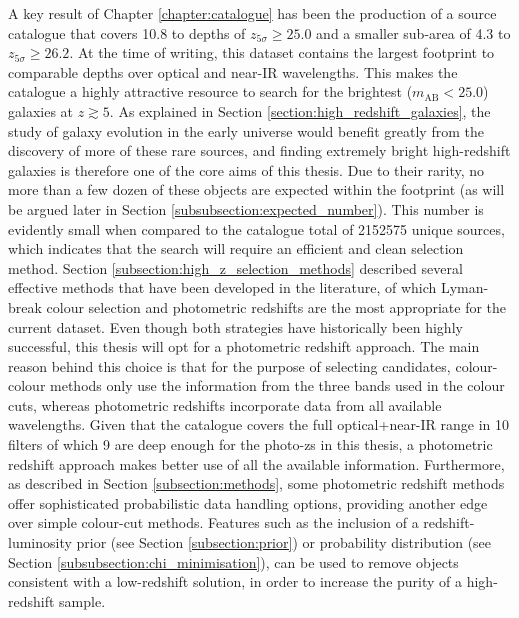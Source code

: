 A key result of Chapter \ref{chapter:catalogue} has been the production of a \DESVIDEO source catalogue  that covers \SI{10.8}{\sqdeg} to depths of $z_{5\sigma}\geq25.0$ and a smaller sub-area of \SI{4.3}{\sqdeg} to $z_{5\sigma}\geq26.2$. At the time of writing, this dataset contains the largest footprint to comparable depths over optical and near-IR wavelengths. This makes the \DESVIDEO catalogue a highly attractive resource to search for the brightest ($m_{\mathrm{AB}}<25.0$) galaxies at $z\gtrsim5$. As explained in Section \ref{section:high_redshift_galaxies}, the study of galaxy evolution in the early universe would benefit greatly from the discovery of more of these rare sources, and finding extremely bright high-redshift galaxies is therefore one of the core aims of this thesis. Due to their rarity, no more than a few dozen of these objects are expected within the \DESVIDEO footprint (as will be argued later in Section \ref{subsubsection:expected_number}). This number is evidently small when compared to the catalogue total of \num{2 152 575} unique sources, which indicates that the search will require an efficient and clean selection method. Section \ref{subsection:high_z_selection_methods} described several effective methods that have been developed in the literature, of which Lyman-break colour selection and photometric redshifts are the most appropriate for the current dataset. Even though both strategies have historically been highly successful, this thesis  will opt for a photometric redshift approach. The main reason behind this choice is that for the purpose of selecting candidates, colour-colour methods only use the information from the three bands used in the colour cuts, whereas photometric redshifts incorporate data from all available wavelengths. Given that the \DESVIDEO catalogue covers the full optical+near-IR range in 10 filters of which 9 are deep enough for the photo-zs in this thesis, a photometric redshift approach makes better use of all the available information. Furthermore, as described in Section \ref{subsection:methods}, some photometric redshift methods offer sophisticated probabilistic data handling options, providing another edge over simple colour-cut methods. Features such as the inclusion of a redshift-luminosity prior (see Section \ref{subsection:prior}) or probability distribution (see Section \ref{subsubsection:chi_minimisation}), can be used to remove objects consistent with a low-redshift solution, in order to increase the purity of a high-redshift sample. \par


